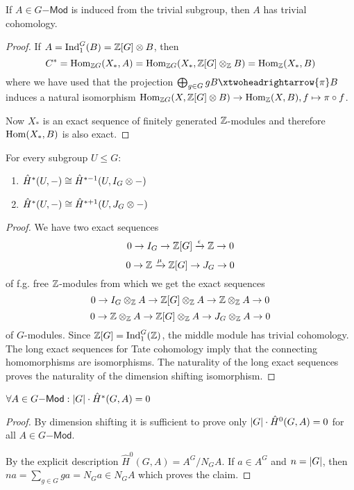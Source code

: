 \documentclass[fontsize=11pt,fleqn,a4paper]{scrartcl}
\begin{document}
\begin{theorem}
If $A\in G\mathsf{-Mod}$ is induced from the trivial subgroup, then $A$ has trivial cohomology.
\end{theorem}
\begin{proof}
If $A=\operatorname{Ind}_1^G(B) = \mathbb{Z}[G]\otimes B$, then
\[C^\ast = \operatorname{Hom}_{\mathbb{Z} G}(X_\ast, A) = \operatorname{Hom}_{\mathbb{Z} G}(X_\ast,\mathbb{Z}[G]\otimes_{\mathbb{Z}} B) = \operatorname{Hom}_{\mathbb{Z}}(X_\ast,B)\]
where we have used that the projection $\bigoplus_{g\in G} gB \xtwoheadrightarrow{\pi} B$ induces a natural isomorphism $\operatorname{Hom}_{\mathbb{Z} G}(X,\mathbb{Z}[G]\otimes B) \to \operatorname{Hom}_{\mathbb{Z}}(X,B), f\mapsto \pi\circ f$.

Now $X_\ast$ is an exact sequence of finitely generated $\mathbb{Z}$-modules and therefore $\operatorname{Hom}(X_\ast,B)$ is also exact.
\end{proof}

\begin{theorem}
For every subgroup $U\leq G$:
\begin{enumerate}
\item $\hat{H}^\ast(U,-) \cong \hat{H}^{\ast-1}(U,I_G\otimes -)$
\item $\hat{H}^\ast(U,-) \cong \hat{H}^{\ast+1}(U,J_G\otimes -)$
\end{enumerate}
\end{theorem}
\begin{theorem}
\end{theorem}
\begin{proof}
We have two exact sequences
\[0\to I_G\to\mathbb{Z}[G]\xrightarrow{\epsilon} \mathbb{Z}\to 0\]
\[0\to \mathbb{Z} \xrightarrow{\mu} \mathbb{Z}[G] \to J_G \to 0\]
of f.g. free $\mathbb{Z}$-modules from which we get the exact sequences
\[0 \to I_G \otimes_{\mathbb{Z}} A \to \mathbb{Z}[G]\otimes_{\mathbb{Z}} A \to \mathbb{Z}\otimes_{\mathbb{Z}} A \to 0\]
\[0 \to \mathbb{Z}\otimes_{\mathbb{Z}} A\to \mathbb{Z}[G]\otimes_{\mathbb{Z}} A\to J_G\otimes_{\mathbb{Z}} A\to 0\]
of $G$-modules. Since $\mathbb{Z}[G]=\operatorname{Ind}_1^G(\mathbb{Z})$, the middle module has trivial cohomology. The long exact sequences for Tate cohomology imply that the connecting homomorphisms are isomorphisms. The naturality of the long exact sequences proves the naturality of the dimension shifting isomorphism.
\end{proof}

\begin{corollary}
$\forall A\in G\mathsf{-Mod}: \lvert G\rvert \cdot \hat{H}^\ast(G,A) = 0$
\end{corollary}
\begin{proof}
By dimension shifting it is sufficient to prove only $\lvert G\rvert \cdot \hat{H}^0(G,A) = 0$ for all $A\in G\mathsf{-Mod}$.

By the explicit description $\hat{H}^0(G,A) = A^G/N_G A$. If $a\in A^G$ and $n=\lvert G\rvert$, then $na = \sum_{g\in G} ga = N_G a \in N_G A$ which proves the claim.
\end{proof}
\end{document}
